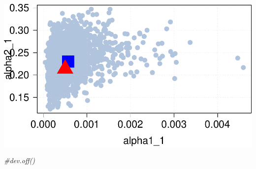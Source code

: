 \documentclass[
]{article}
\newenvironment{Shaded}{\begin{snugshade}}{\end{snugshade}}
\newcommand{\CommentTok}[1]{\textcolor[rgb]{0.56,0.35,0.01}{\textit{#1}}}
\begin{document}
\includegraphics{MS-GARCH_files/figure-latex/unnamed-chunk-11-1.pdf}

\begin{Shaded}
\begin{Highlighting}[]
\CommentTok{\#dev.off()}
\end{Highlighting}
\end{Shaded}
\end{document}
